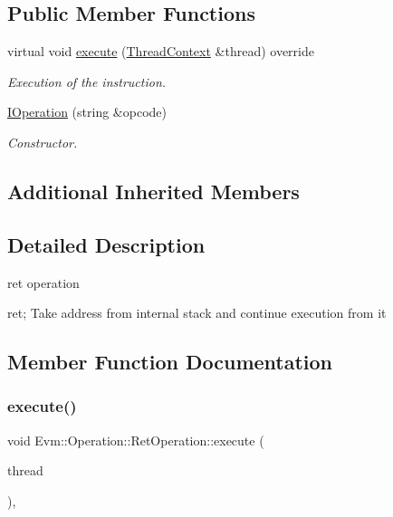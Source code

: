 \subsection*{Public Member Functions}
\begin{DoxyCompactItemize}
\item 
virtual void \mbox{\hyperlink{struct_evm_1_1_operation_1_1_ret_operation_a34e691c30765bc62ea4c19d2896750b1}{execute}} (\mbox{\hyperlink{struct_evm_1_1_thread_context}{Thread\+Context}} \&thread) override
\begin{DoxyCompactList}\small\item\em Execution of the instruction. \end{DoxyCompactList}\item 
\mbox{\hyperlink{struct_evm_1_1_operation_1_1_ret_operation_a65e98ee1b1679e12c1d1dd000ebfe937}{I\+Operation}} (string \&opcode)
\begin{DoxyCompactList}\small\item\em Constructor. \end{DoxyCompactList}\end{DoxyCompactItemize}
\subsection*{Additional Inherited Members}


\subsection{Detailed Description}
ret operation 

ret; Take address from internal stack and continue execution from it 

\subsection{Member Function Documentation}
\mbox{\label{struct_evm_1_1_operation_1_1_ret_operation_a34e691c30765bc62ea4c19d2896750b1}} 
\subsubsection{\texorpdfstring{execute()}{execute()}}
{\footnotesize\ttfamily void Evm\+::\+Operation\+::\+Ret\+Operation\+::execute (\begin{DoxyParamCaption}\item[{\mbox{\hyperlink{struct_evm_1_1_thread_context}{Thread\+Context}} \&}]{thread }\end{DoxyParamCaption})\hspace{0.3cm}{\ttfamily [override]}, {\ttfamily [virtual]}}



